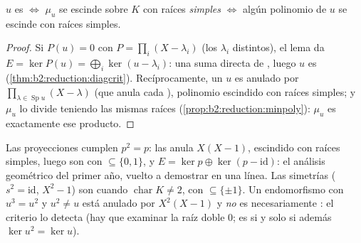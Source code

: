 \begin{corollary}\label{cor:b2:reduction:minpolycrit}
$u$ es  $\iff$ $\mu_u$ se escinde sobre $K$ con
raíces \emph{simples} $\iff$ algún polinomio  de $u$ se
escinde con raíces simples.
\end{corollary}

\begin{proof}
Si $P(u) = 0$ con $P = \prod_{i}(X - \lambda_i)$ (los $\lambda_i$
distintos), el lema da $E = \ker P(u) = \bigoplus_i \ker(u -
\lambda_i)$: una suma directa de , luego $u$ es
 (\cref{thm:b2:reduction:diagcrit}). Recíprocamente,
un $u$  es anulado por $\prod_{\lambda \in
\operatorname{Sp}u}(X - \lambda)$ (que anula cada ), polinomio escindido con raíces simples; y $\mu_u$ lo
divide teniendo las mismas raíces
(\cref{prop:b2:reduction:minpoly}): $\mu_u$ es exactamente ese
producto.
\end{proof}

\begin{example}\label{ex:b2:reduction:projections}
Las proyecciones cumplen $p^2 = p$: las anula $X(X-1)$, escindido
con raíces simples, luego son  con 
$\subseteq \{0, 1\}$, y $E = \ker p \oplus \ker(p - \mathrm{id})$: el
análisis geométrico del primer año, vuelto a demostrar en una línea.
Las simetrías ($s^2 = \mathrm{id}$,  $X^2 - 1$) son
 cuando $\operatorname{char} K \neq 2$, con
 $\subseteq \{\pm 1\}$. Un endomorfismo con $u^3 = u^2$ y
$u^2 \neq u$ está anulado por $X^2(X - 1)$ y \emph{no} es
necesariamente : el criterio lo detecta (hay que
examinar la raíz doble $0$; es  si y solo si además
$\ker u^2 = \ker u$).
\end{example}

